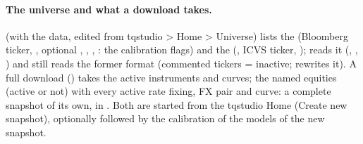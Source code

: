 \paragraph{The universe and what a download takes.}  (with the data, edited from tqstudio >
Home > Universe) lists the  (Bloomberg ticker, , optional ,
, , : the calibration flags) and the 
(, ICVS ticker, );  reads it (,
, ) and still reads the former format (commented tickers =
inactive;  rewrites it). A full download () takes the active
instruments and curves;  the named equities (active or
not) with every active rate fixing, FX pair and curve: a complete snapshot of its own,  in
. Both are started from the tqstudio Home (Create new snapshot), optionally followed by the
calibration of the models of the new snapshot.

